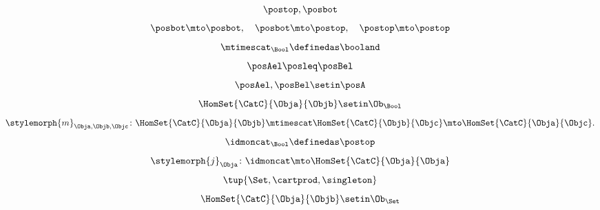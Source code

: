 {\begin{forslides}
\begin{equation}
        \end{equation}
        \begin{equation}
            \label{eq:poset_bool_b}
            \postop,\posbot
        \end{equation}
        \begin{equation}
            \label{eq:poset_bool_c}
            \posbot\mto \posbot, \quad \posbot\mto \postop, \quad \postop\mto \postop
        \end{equation}
        \begin{equation}
            \label{eq:poset_bool_d}
            \mtimescat_\Bool \definedas \booland
        \end{equation}
        \begin{equation}
            \label{eq:poset_bool_e}
            \posAel\posleq \posBel
        \end{equation}
        \begin{equation}
            \label{eq:poset_bool_f}
            \posAel,\posBel \setin \posA
        \end{equation}
        \begin{equation}
            \label{eq:poset_bool_g}
            \HomSet{\CatC}{\Obja}{\Objb}\setin \Ob_\Bool
        \end{equation}
        \begin{equation}
            \label{eq:poset_bool_h}
            \stylemorph{m}_{\Obja,\Objb,\Objc}\colon \HomSet{\CatC}{\Obja}{\Objb}\mtimescat \HomSet{\CatC}{\Objb}{\Objc}\mto \HomSet{\CatC}{\Obja}{\Objc}.
        \end{equation}
        \begin{equation}
            \label{eq:poset_bool_i}
            \idmoncat_\Bool \definedas \postop
        \end{equation}
        \begin{equation}
            \label{eq:poset_bool_k}
            \stylemorph{j}_\Obja\colon \idmoncat \mto \HomSet{\CatC}{\Obja}{\Obja}
        \end{equation}
        \begin{equation}
            \label{eq:poset_bool_j}
            \tup{\Set, \cartprod, \singleton}
        \end{equation}
        \begin{equation}
            \label{eq:poset_bool_l}
            \HomSet{\CatC}{\Obja}{\Objb}\setin \Ob_\Set
        \end{equation}
        \begin{equation}

\end{equation}
\end{forslides}}
